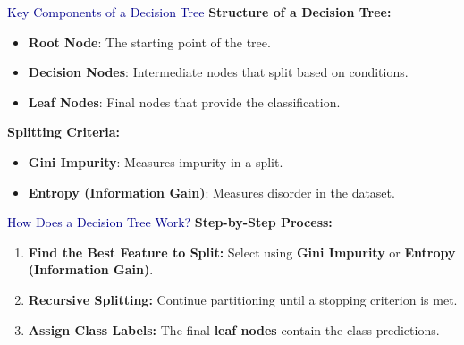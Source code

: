 \begin{frame}{\textcolor{darkblue}{Key Components of a Decision Tree}}
    \textbf{Structure of a Decision Tree:}
    \begin{itemize}
        \item \textbf{Root Node}: The starting point of the tree.
        \item  \textbf{Decision Nodes}: Intermediate nodes that split based on conditions.
        \item \textbf{Leaf Nodes}: Final nodes that provide the classification.
    \end{itemize}

    \textbf{Splitting Criteria:}
    \begin{itemize}
        \item \textbf{Gini Impurity}: Measures impurity in a split.
        \item \textbf{Entropy (Information Gain)}: Measures disorder in the dataset.
    \end{itemize}
\end{frame}

\begin{frame}{\textcolor{darkblue}{How Does a Decision Tree Work?}}
    \textbf{Step-by-Step Process:}
    \begin{enumerate}
        \item \textbf{Find the Best Feature to Split:} Select using \textbf{Gini Impurity} or \textbf{Entropy (Information Gain)}.
        \item \textbf{Recursive Splitting:} Continue partitioning until a stopping criterion is met.
        \item \textbf{Assign Class Labels:} The final \textbf{leaf nodes} contain the class predictions.
    \end{enumerate}
\end{frame}


